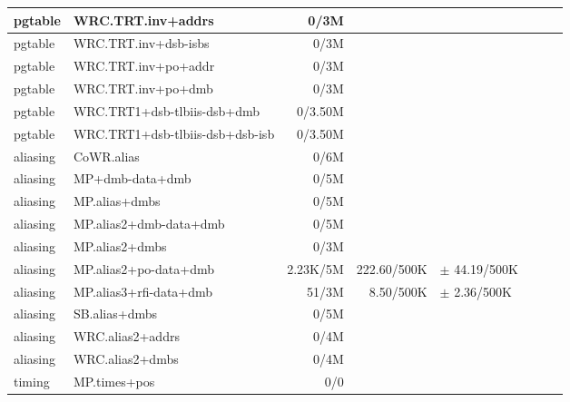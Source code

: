 \begin{tabular}{l l  | r r l | r r l}
\hline
   pgtable&WRC.TRT.inv+addrs&0/3M&&&\\
\hline
   pgtable&WRC.TRT.inv+dsb-isbs&0/3M&&&\\
\hline
   pgtable&WRC.TRT.inv+po+addr&0/3M&&&\\
\hline
   pgtable&WRC.TRT.inv+po+dmb&0/3M&&&\\
\hline
   pgtable&WRC.TRT1+dsb-tlbiis-dsb+dmb&0/3.50M&&&\\
\hline
   pgtable&WRC.TRT1+dsb-tlbiis-dsb+dsb-isb&0/3.50M&&&\\
\hline
   aliasing&CoWR.alias&0/6M&&&\\
\hline
   aliasing&MP+dmb-data+dmb&0/5M&&&\\
\hline
   aliasing&MP.alias+dmbs&0/5M&&&\\
\hline
   aliasing&MP.alias2+dmb-data+dmb&0/5M&&&\\
\hline
   aliasing&MP.alias2+dmbs&0/3M&&&\\
\hline
   aliasing&MP.alias2+po-data+dmb&2.23K/5M&222.60/500K&$\pm$ 44.19/500K&\\
\hline
   aliasing&MP.alias3+rfi-data+dmb&51/3M&8.50/500K&$\pm$ 2.36/500K&\\
\hline
   aliasing&SB.alias+dmbs&0/5M&&&\\
\hline
   aliasing&WRC.alias2+addrs&0/4M&&&\\
\hline
   aliasing&WRC.alias2+dmbs&0/4M&&&\\
\hline
   timing&MP.times+pos&0/0&&&\\
\hline
\hline
\end{tabular}
